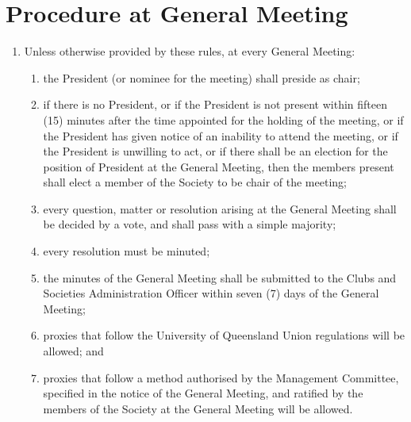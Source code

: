 \documentclass[a4paper]{article}
\newcommand*{\sectionr}[1]{{\raggedright \section{#1}}}
\begin{document}
\sectionr{Procedure at General Meeting}
\begin{enumerate}
\item Unless otherwise provided by these rules, at every General Meeting:
	\begin{enumerate}
	\item the President (or nominee for the meeting) shall preside as chair;
	\item if there is no President, or if the President is not present within fifteen (15) minutes after the time appointed for the holding of the meeting, or if the President has given notice of an inability to attend the meeting, or if the President is unwilling to act, or if there shall be an election for the position of President at the General Meeting, then the members present shall elect a member of the Society to be chair of the meeting;
	\item every question, matter or resolution arising at the General Meeting shall be decided by a vote, and shall pass with a simple majority;
	\item every resolution must be minuted;
	\item the minutes of the General Meeting shall be submitted to the Clubs and Societies Administration Officer within seven (7) days of the General Meeting;
	\item proxies that follow the University of Queensland Union regulations will be allowed; and
	\item proxies that follow a method authorised by the Management Committee, specified in the notice of the General Meeting, and ratified by the members of the Society at the General Meeting will be allowed.
	\end{enumerate}
\end{enumerate}
\end{document}
